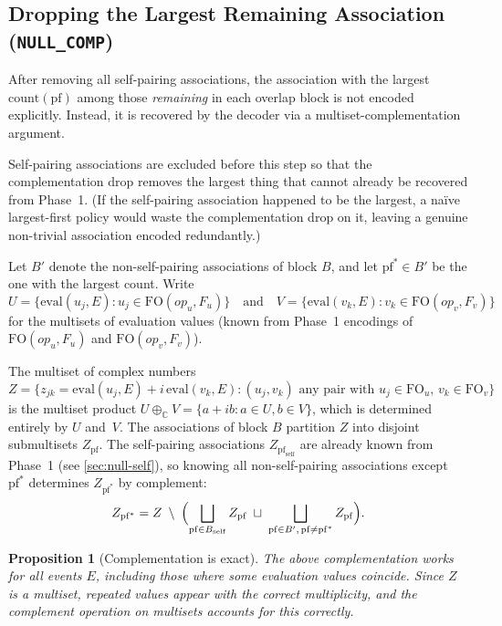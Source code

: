 \documentclass[11pt,a4paper]{article}
\theoremstyle{definition}
\theoremstyle{plain}
\newtheorem{proposition}[definition]{Proposition}
\theoremstyle{remark}
\newcommand{\C}{\mathbb{C}}
\newcommand{\eval}{\mathrm{eval}}
\newcommand{\fo}{\mathrm{FO}}
\newcommand{\pf}{\mathrm{pf}}
\newcommand{\acount}{\mathrm{count}}
\begin{document}
\subsection{Dropping the Largest Remaining Association (\texttt{NULL\_COMP})}
\label{sec:null-comp}

After removing all self-pairing associations, the association with the largest
$\acount(\pf)$ among those \emph{remaining} in each overlap block is not encoded
explicitly.  Instead, it is recovered by the decoder via a
multiset-complementation argument.

Self-pairing associations are excluded before this step so that the
complementation drop removes the largest thing that cannot already be recovered
from Phase~1.  (If the self-pairing association happened to be the largest, a
naïve largest-first policy would waste the complementation drop on it, leaving a
genuine non-trivial association encoded redundantly.)

Let $B'$ denote the non-self-pairing associations of block $B$, and let
$\pf^* \in B'$ be the one with the largest count.  Write
\[
  U = \{\eval(u_j, E) : u_j \in \fo(\mathit{op}_u, F_u)\}
  \quad\text{and}\quad
  V = \{\eval(v_k, E) : v_k \in \fo(\mathit{op}_v, F_v)\}
\]
for the multisets of evaluation values (known from Phase~1 encodings of
$\fo(\mathit{op}_u, F_u)$ and $\fo(\mathit{op}_v, F_v)$).

The multiset of complex numbers
\[
  Z = \{z_{jk} = \eval(u_j,E) + i\,\eval(v_k,E) : (u_j,v_k)
  \text{ any pair with $u_j \in \fo_u$, $v_k \in \fo_v$}\}
\]
is the multiset product $U \oplus_\C V = \{a + ib : a \in U, b \in V\}$, which
is determined entirely by $U$ and~$V$.  The associations of block $B$ partition
$Z$ into disjoint submultisets $Z_\pf$.  The self-pairing associations
$Z_{\pf_\mathrm{self}}$ are already known from Phase~1 (see
\cref{sec:null-self}), so knowing all non-self-pairing associations except
$\pf^*$ determines $Z_{\pf^*}$ by complement:
\[
  Z_{\pf^*} = Z \;\setminus\; \Bigl(
    \bigsqcup_{\pf \in B_\mathrm{self}} Z_\pf
    \;\sqcup\;
    \bigsqcup_{\pf \in B',\, \pf\ne \pf^*} Z_\pf
  \Bigr).
\]

\begin{proposition}[Complementation is exact]
The above complementation works for \emph{all} events $E$, including those
where some evaluation values coincide.  Since $Z$ is a multiset, repeated
values appear with the correct multiplicity, and the complement operation on
multisets accounts for this correctly.
\end{proposition}
\end{document}
